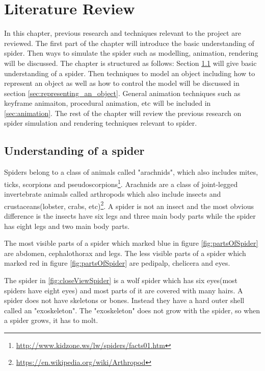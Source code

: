 \chapter{Literature Review}
In this chapter, previous research and techniques relevant to the
project are reviewed. The first part of the chapter will introduce 
the basic understanding of spider. Then ways to simulate the spider such 
as modelling, animation, rendering will be discussed. The chapter is structured as
follows: Section \ref{sec:Understanding of a spider} will give basic understanding of 
a spider. Then techniques to model an object including how to represent an object as well 
as how to control the model will be discussed in section \ref{sec:representing_an_object}. 
General animation techniques such as keyframe animaiton, procedural animation, etc will be 
included in \ref{sec:animation}. The rest of the chapter will review the previous research 
on spider simulation and rendering techniques relevant to spider.




\section{Understanding of a spider} %
\label{sec:Understanding of a spider}

Spiders belong to a class of animals called "arachnids", which also includes mites, ticks, scorpions and pseudoscorpions\footnote{\url{http://www.kidzone.ws/lw/spiders/facts01.htm}}. Arachnids are a class of joint-legged invertebrate animals called arthropods which also include insects and crustaceans(lobster, crabs, etc)\footnote{\url{https://en.wikipedia.org/wiki/Arthropod}}. A spider is not an insect and the most obvious difference is the insects have six legs and three main body parts while the spider has eight legs and two main body parts. 

The most visible parts of a spider which marked blue in figure \ref{fig:partsOfSpider} are abdomen, cephalothorax and legs. The less visible parts of a spider which marked red in figure \ref{fig:partsOfSpider} are pedipalp, chelicera and eyes. 

The spider in \ref{fig:closeViewSpider} is a wolf spider which has six eyes(most spiders have eight eyes) and most parts of it are covered with many hairs. A spider does not have skeletons or bones. Instead they have a hard outer shell called an "exoskeleton". The "exoskeleton" does not grow with the spider, so when a spider grows, it has to molt.


